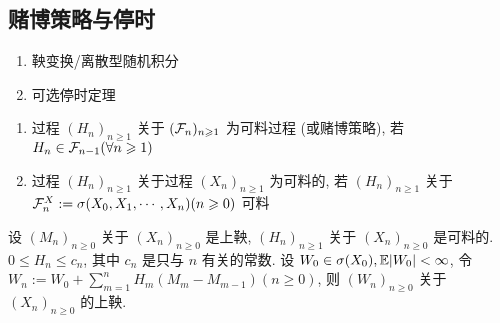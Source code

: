 \subsection{赌博策略与停时}

\begin{enumerate}
    \item 鞅变换/离散型随机积分
    \item 可选停时定理
\end{enumerate}

\begin{definition}
    \begin{enumerate}
        \item 过程 $(H_n)_{n\geq 1}$ 关于 $(\mathcal{F}_n)_{n\geqslant 1}$ 为可料过程 (或赌博策略), 若 $H_n\in \mathcal{F}_{n-1}(\forall n\geqslant 1)$
        \item 过程 $(H_n)_{n\geq 1}$ 关于过程 $(X_n)_{n\geq 1}$ 为可料的, 若 $(H_n)_{n\geq 1}$ 关于 $\mathcal{F}_n^X:=\sigma(X_0,X_1,\cdots,X_n) (n\geqslant 0)$ 可料
    \end{enumerate}
\end{definition}

\begin{theorem}\label{thm:martingale-transform}
设 $(M_n)_{n\geq 0}$ 关于 $(X_n)_{n\geq 0}$ 是上鞅, $(H_n)_{n\geq 1}$ 关于 $(X_n)_{n\geq 0}$ 是可料的. $0\leq H_n\leq c_n$, 其中 $c_n$ 是只与 $n$ 有关的常数. 设 $W_0\in \sigma(X_0), \mathbb E|W_0|<\infty$, 令 $W_n:=W_0+\sum_{m=1}^n H_m(M_m-M_{m-1})(n\geq 0)$, 则 $(W_n)_{n\geq 0}$ 关于 $(X_n)_{n\geq 0}$ 的上鞅.
\end{theorem}

